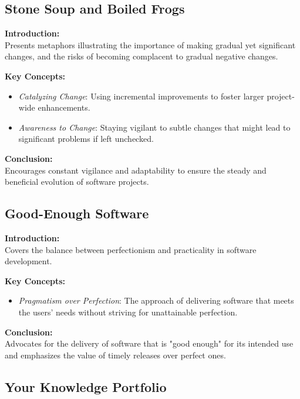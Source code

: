 \subsection{Stone Soup and Boiled Frogs}

\textbf{Introduction:} \\
Presents metaphors illustrating the importance of making gradual yet significant changes, and the risks of becoming complacent to gradual negative changes.

\vspace{2mm}
\noindent\textbf{Key Concepts:}
\begin{itemize}
  \item \textit{Catalyzing Change}: Using incremental improvements to foster larger project-wide enhancements.
  \item \textit{Awareness to Change}: Staying vigilant to subtle changes that might lead to significant problems if left unchecked.
\end{itemize}

\vspace{2mm}
\noindent\textbf{Conclusion:} \\
Encourages constant vigilance and adaptability to ensure the steady and beneficial evolution of software projects.

\subsection{Good-Enough Software}

\textbf{Introduction:} \\
Covers the balance between perfectionism and practicality in software development.

\vspace{2mm}
\noindent\textbf{Key Concepts:}
\begin{itemize}
  \item \textit{Pragmatism over Perfection}: The approach of delivering software that meets the users' needs without striving for unattainable perfection.
\end{itemize}

\vspace{2mm}
\noindent\textbf{Conclusion:} \\
Advocates for the delivery of software that is "good enough" for its intended use and emphasizes the value of timely releases over perfect ones.

\subsection{Your Knowledge Portfolio}

